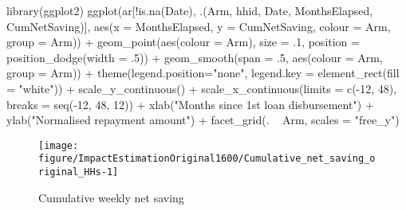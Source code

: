 \begin{Schunk}
\begin{Sinput}
library(ggplot2)
ggplot(ar[!is.na(Date), .(Arm, hhid, Date, MonthsElapsed, CumNetSaving)], 
  aes(x = MonthsElapsed, y = CumNetSaving, colour = Arm, group = Arm)) +
  geom_point(aes(colour = Arm), size = .1, position = position_dodge(width = .5)) +
  geom_smooth(span = .5, aes(colour = Arm, group = Arm)) +
  theme(legend.position="none", legend.key = element_rect(fill = "white")) + 
  scale_y_continuous() +
  scale_x_continuous(limits = c(-12, 48), breaks = seq(-12, 48, 12)) +
  xlab("Months since 1st loan disbursement") + ylab("Normalised repayment amount") +
  facet_grid(. ~ Arm, scales = "free_y")
\end{Sinput}
\begin{figure}

{\centering \texttt{[image: figure/ImpactEstimationOriginal1600/Cumulative\_net\_saving\_original\_HHs-1]} 

}

\caption[Cumulative weekly net saving]{Cumulative weekly net saving}\label{Figure Cumulative net saving original HHs}
\end{figure}
\end{Schunk}

